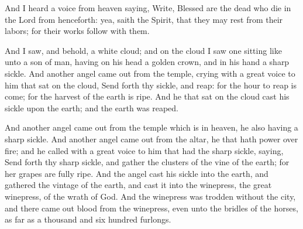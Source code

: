  And I heard a voice from heaven saying, Write, Blessed are the dead who die in the Lord from henceforth: yea, saith the Spirit, that they may rest from their labors; for their works follow with them.

 And I saw, and behold, a white cloud; and on the cloud I saw one sitting like unto a son of man, having on his head a golden crown, and in his hand a sharp sickle. 
 And another angel came out from the temple, crying with a great voice to him that sat on the cloud, Send forth thy sickle, and reap: for the hour to reap is come; for the harvest of the earth is ripe. 
 And he that sat on the cloud cast his sickle upon the earth; and the earth was reaped.

 And another angel came out from the temple which is in heaven, he also having a sharp sickle. 
 And another angel came out from the altar, he that hath power over fire; and he called with a great voice to him that had the sharp sickle, saying, Send forth thy sharp sickle, and gather the clusters of the vine of the earth; for her grapes are fully ripe. 
 And the angel cast his sickle into the earth, and gathered the vintage of the earth, and cast it into the winepress, the great winepress, of the wrath of God. 
 And the winepress was trodden without the city, and there came out blood from the winepress, even unto the bridles of the horses, as far as a thousand and six hundred furlongs.
